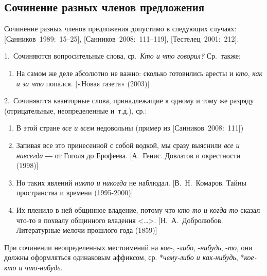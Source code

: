 \subsection{Сочинение разных членов
  предложения}\label{ux441ux43eux447ux438ux43dux435ux43dux438ux435-ux440ux430ux437ux43dux44bux445-ux447ux43bux435ux43dux43eux432-ux43fux440ux435ux434ux43bux43eux436ux435ux43dux438ux44f}

Сочинение разных членов предложения допустимо в следующих случаях:
{[}Санников~1989:~15--25{]}, {[}Санников~2008:~111--119{]},
{[}Тестелец~2001:~212{]}.

1.~Сочиняются вопросительные слова, ср.~\textit{Кто и что говорил?}
Ср.~также:

\begin{enumerate}
  \def\labelenumi{(\arabic{enumi})}
  \setcounter{enumi}{32}
  \item
        На самом же деле абсолютно не важно: сколько готовились аресты и
        \textit{кто}, \textit{как и за что} попался. {[}«Новая газета» (2003){]}
\end{enumerate}

2.~Сочиняются кванторные слова, принадлежащие к одному и тому же разряду
(отрицательные, неопределенные и~т.д.), ср.:

\begin{enumerate}
  \def\labelenumi{(\arabic{enumi})}
  \setcounter{enumi}{33}
  \item
        В этой стране \textit{все и всем} недовольны (пример из
        {[}Санников~2008:~111{]})
  \item
        Запивая все это принесенной с собой водкой, мы сразу выяснили
        \textit{все и навсегда} ― от Гоголя до Ерофеева. {[}А.~Генис. Довлатов и
        окрестности (1998){]}
  \item
        Но таких явлений \textit{никто и никогда} не наблюдал. {[}В.~Н.~Комаров.
        Тайны пространства и времени (1995-2000){]}
  \item
        Их пленило в ней общинное владение, потому что \textit{кто-то и
          когда-то} сказал что-то в похвалу общинного владения
        \textless\ldots\textgreater. {[}Н.~А.~Добролюбов. Литературные мелочи
        прошлого года (1859){]}
\end{enumerate}

При сочинении неопределенных местоимений на \textit{кое}-, -\textit{либо},
-\textit{нибудь}, -\textit{то}, они должны оформляться одинаковым аффиксом,
ср. *\textit{чему-либо и как-нибудь}, *\textit{кое-кто и что-нибудь}.

